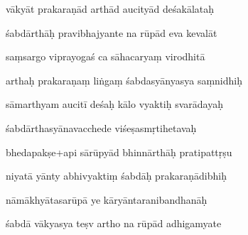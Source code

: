 \documentclass[article,12pt,a4paper]{memoir}%
\newcounter{parCount}
\begin{document}
	  
	  \pstart {} vākyāt prakaraṇād arthād aucityād deśakālataḥ 
	{}
	\pend%
      

	  
	  \pstart \leavevmode%
	śabdārthāḥ pravibhajyante na rūpād eva kevalāt 
	{}
	\pend%
      

	  
	  \pstart {} saṃsargo viprayogaś ca sāhacaryaṃ virodhitā 
	{}
	\pend%
      

	  
	  \pstart \leavevmode%
	arthaḥ prakaraṇaṃ liṅgaṃ śabdasyānyasya saṃnidhiḥ 
	{}
	\pend%
      

	  
	  \pstart {} sāmarthyam aucitī deśaḥ kālo vyaktiḥ svarādayaḥ 
	{}
	\pend%
      

	  
	  \pstart \leavevmode%
	śabdārthasyānavacchede viśeṣasmṛtihetavaḥ 
	{}
	\pend%
      

	  
	  \pstart {} bhedapakṣe+api sārūpyād bhinnārthāḥ pratipattṛṣu 
	{}
	\pend%
      

	  
	  \pstart \leavevmode%
	niyatā yānty abhivyaktiṃ śabdāḥ prakaraṇādibhiḥ 
	{}
	\pend%
      

	  
	  \pstart {} nāmākhyātasarūpā ye kāryāntaranibandhanāḥ 
	{}
	\pend%
      

	  
	  \pstart \leavevmode%
	śabdā vākyasya teṣv artho na rūpād adhigamyate 
	{}
	\pend%
      
\end{document}
